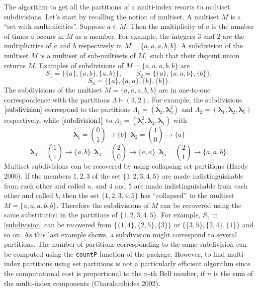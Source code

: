 The algorithm to get all the partitions of a multi-index resorts to multiset subdivisions. Let's start by recalling the notion of multiset. A multiset \(M\) is a ``set with multiplicities''. Suppose \(a \in M.\) Then the multiplicity of \(a\) is the number of times \(a\) occurs in \(M\) as a member. For example, the integers \(3\) and \(2\) are the multiplicities of \(a\) and \(b\) respectively in \(M = \{a,a,a,b,b\}.\) A subdivision of the multiset \(M\) is a multiset of sub-multisets of \(M,\) such that their disjoint union returns \(M\). Examples of subdivisions of \(M = \{a,a,a,b,b\}\) are
\begin{equation}
S_1 = \{\{a\},\{a,b\},\{a,b\}\}, \qquad 
S_2 = \{\{a\},\{a,a,b\},\{b\}\}, 
\label{subdivision}
\end{equation}
\begin{equation}
S_3  = \{\{a\},\{a,a\},\{b\},\{b\}\}.
\label{subdivision1}
\end{equation}
The subdivisions of the multiset \(M = \{a,a,a,b,b\}\) are in one-to-one correspondence with the partitions \(\Lambda \vdash (3,2).\) For example, the subdivisions \(\eqref{subdivision}\) correspond to the partitions \(\Lambda_1 = (\boldsymbol{\lambda}_2, \boldsymbol{\lambda}_3^2)\) and \(\Lambda_2 = (\boldsymbol{\lambda}_1, \boldsymbol{\lambda}_2,\boldsymbol{\lambda}_5)\) respectively, while \(\eqref{subdivision1}\) to \(\Lambda_3 = (\boldsymbol{\lambda}_1^2, \boldsymbol{\lambda}_2,\boldsymbol{\lambda}_4)\) with
\[ \boldsymbol{\lambda}_1={0 \choose 1} \! \rightarrow \! \{b\} \,\,\, \boldsymbol{\lambda}_2={1 \choose 0}  \! \rightarrow \! \{a\}\] \[\boldsymbol{\lambda}_3={1 \choose 1}  \! \rightarrow \! \{a,b\} \,\,\, \boldsymbol{\lambda}_4={2 \choose 0}  \! \rightarrow \! \{a,a\} \,\,\,  \boldsymbol{\lambda}_5={2 \choose 1}  \! \rightarrow \!\{a,a,b\}.\]
Multiset subdivisions can be recovered by using collapsing set partitions (Hardy 2006). If the members \(1, 2, 3\) of the set \(\{ 1, 2, 3, 4, 5\}\) are made indistinguishable from each other and called \(a\), and \(4\) and \(5\) are made indistinguishable from each other and called \(b\), then the set \(\{ 1, 2, 3, 4, 5\}\) has ``collapsed'' to the multiset \(M = \{a,a,a,b,b\}.\) Therefore the subdivisions of \(M\) can be recovered using the same substitution in the partitions of \(\{ 1, 2, 3, 4, 5\}.\) For example, \(S_1\) in \eqref{subdivision} can be recovered from \(\{\{1,4\},\{2,5\}, \{3\}\}\) or \(\{\{3,5\},\{2,4\}, \{1\}\}\) and so on. As this last example shows, a subdivision might correspond to several partitions. The number of partitions corresponding to the same subdivision can be computed using the \texttt{countP} function of the package. However, to find multi-index partitions using set partitions is not a particularly efficient algorithm since the computational cost is proportional to the \(n\)-th Bell number, if \(n\) is the sum of the multi-index components (Charalambides 2002).

